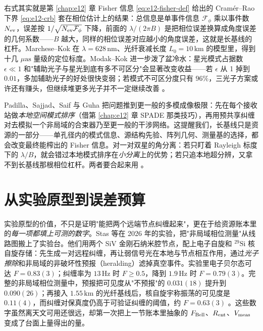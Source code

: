 右式其实就是第 \ref{chap:e12} 章 Fisher 信息 \eqref{eq:e12-fisher-def} 给出的 Cramér--Rao 下界 \eqref{eq:e12-crb} 套在相位估计上的结果：总信息是单事件信息 \(\mathcal F_\phi\) 乘以事件数 \(N_{\rm ev}\)，误差按 \(1/\sqrt{N_{\rm ev}\mathcal F_\phi}\) 下降，前面的 \(\lambda/(2\pi B)\) 是把相位误差换算成角度误差的几何系数——\(B\) 越大，同样的相位误差对应越小的角度误差，这就是长基线的杠杆。Marchese--Kok 在 \(\lambda=628\,\mathrm{nm}\)、光纤衰减长度 \(L_0=10\,\mathrm{km}\) 的模型里，得到十几 \(\mu\mathrm{as}\) 量级的定位标度。Modak--Kok 进一步泼了盆冷水：星光模式占据数 \(\epsilon\ll1\) 和"辅助光子与星光到底有多不可区分"会显著改变收益——若 \(\epsilon\) 从 1 掉到 \(0.01\)，多加辅助光子的好处很快变弱；若模式不可区分度只有 \(96\%\)，三光子方案或许还有赚头，但继续堆更多光子并不一定继续改善 \citep{2023PhRvL.130p0801M,2025PhRvA.111d3701M}。

Padilla、Sajjad、Saif 与 Guha 把问题推到更一般的多模成像极限：先在每个接收站做\emph{本地空间模式排序}（借第 \ref{chap:e12} 章 SPADE 那类技巧），再用预共享纠缠对去模拟一个非局域的合束器乃至更一般的干涉网络。这提醒我们，长基线只是资源的一部分——单孔径内的模式信息、源结构先验、阵列几何、测量基的选择，都会改变最终能榨出的 Fisher 信息。对一对双星的角分离：若只盯着 Rayleigh 标度下的 \(\lambda/B\)，就会错过本地模式排序在\emph{小分离}上的优势；若只追本地超分辨，又拿不到长基线那根相位杠杆。两者要合起来用 \citep{2026PhRvA.113a2608P,2025PhRvR...7d3278Z}。

\section{从实验原型到误差预算}
\label{sec:e24-prototype}

实验原型的价值，不只是证明"能把两个远端节点纠缠起来"，更在于给资源账本里的\emph{每一项都填上可测的数字}。Stas 等在 2026 年的实验，把"非局域相位测量"从线路图搬上了实验台。他们用两个 SiV 金刚石纳米腔节点，配上电子自旋和 \({}^{29}\mathrm{Si}\) 核自旋存储：先生成一对远程纠缠，再让弱信号光在本地与节点相互作用，通过\emph{光子擦除}和非局域的非破坏性预报（heralding）滤掉真空事件。实验里电子贝尔态可达 \(F=0.83(3)\)；纠缠率为 \(13\,\mathrm{Hz}\) 时 \(F\ge0.5\)，降到 \(1.9\,\mathrm{Hz}\) 时 \(F=0.79(3)\)。完整的非局域相位测量中，预报把可见度从"不预报"的 \(0.031(18)\) 提升到 \(0.090(26)\)；再接入 \(1.55\,\mathrm{km}\) 的光纤基线后，核自旋宇称振荡的可见度是 \(0.11(4)\)，而纠缠对保真度仍高于可验证纠缠的阈值，约 \(F=0.63(3)\) \citep{2026Natur.651..326S}。这些数字虽然离天文可用还很远，却第一次把上一节账本里抽象的 \(F_{\rm Bell}\)、\(R_{\rm ent}\)、\(V_{\rm meas}\) 变成了台面上量得出的量。

